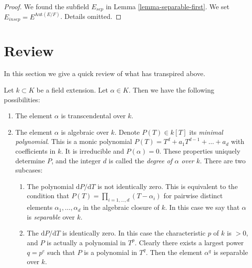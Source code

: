 \begin{proof}
We found the subfield $E_{sep}$ in Lemma \ref{lemma-separable-first}.
We set $E_{insep} = E^{\text{Aut}(E/F)}$. Details omitted.
\end{proof}









\section{Review}
\label{section-algebraic}

\noindent
In this section we give a quick review of what has transpired above.

\medskip\noindent
Let $k \subset K$ be a field extension. Let $\alpha \in K$. Then we have the
following possibilities:
\begin{enumerate}
\item The element $\alpha$ is transcendental over $k$.
\item The element $\alpha$ is algebraic over $k$. Denote
$P(T) \in k[T]$ its {\it minimal polynomial}. This is a monic polynomial
$P(T) = T^d + a_1 T^{d - 1} + \ldots + a_d$ with coefficients in
$k$. It is irreducible and $P(\alpha) = 0$. These properties
uniquely determine $P$, and the integer $d$ is called the
{\it degree of $\alpha$ over $k$}. There are two subcases:
\begin{enumerate}
\item The polynomial $\text{d}P/\text{d}T$ is not identically zero.
This is equivalent to the condition that
$P(T) = \prod_{i = 1, \ldots, d} (T - \alpha_i)$ for
pairwise distinct elements $\alpha_1, \ldots, \alpha_d$
in the algebraic closure of $k$.
In this case we say that $\alpha$ is {\it separable} over $k$.
\item The $\text{d}P/\text{d}T$ is identically zero. In this case the
characteristic $p$ of $k$ is $ > 0$, and $P$ is actually a polynomial
in $T^p$. Clearly there exists a largest power $q = p^e$ such that $P$ is
a polynomial in $T^q$. Then the element $\alpha^q$ is separable over $k$.
\end{enumerate}
\end{enumerate}


